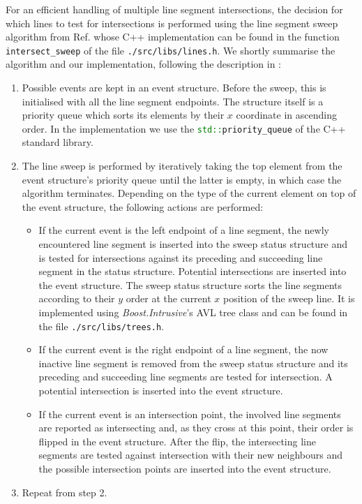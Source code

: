 For an efficient handling of multiple line segment intersections, the decision for which lines to test for intersections is
performed using the line segment sweep algorithm from Ref. \cite[pp. 69-80]{FUH_geo2020} whose C++ implementation can be
found in the function \lstinline[language=C++]|intersect_sweep| of the file \lstinline|./src/libs/lines.h|.
We shortly summarise the algorithm and our implementation, following the description in \cite[pp. 69-80]{FUH_geo2020}:
\begin{enumerate}
	\item Possible events are kept in an event structure. Before the sweep, this is initialised with all the line segment
		endpoints. The structure itself is a priority queue which sorts its elements by their $x$ coordinate in ascending order.
		In the implementation we use the \lstinline[language=C++]|std::priority_queue| of the C++ standard library.
	\item The line sweep is performed by iteratively taking the top element from the event structure's priority queue until
		the latter is empty, in which case the algorithm terminates.
		Depending on the type of the current element on top of the event structure, the following actions are performed:
		\begin{itemize}
			\item If the current event is the left endpoint of a line segment, the newly encountered line segment is
				inserted into the sweep status structure and is tested for intersections against its preceding and succeeding
				line segment in the status structure. Potential intersections are inserted into the event structure.
				The sweep status structure sorts the line segments according to their $y$ order at the current $x$ position
				of the sweep line. It is implemented using \textit{Boost.Intrusive}'s \cite{web_boost_intrusive}
				AVL tree class \cite{web_boost_intrusive_avltree} and can be found in the file \lstinline|./src/libs/trees.h|.
			\item If the current event is the right endpoint of a line segment, the now inactive line segment is
				removed from the sweep status structure and its preceding and succeeding line segments are tested
				for intersection. A potential intersection is inserted into the event structure.
			\item If the current event is an intersection point, the involved line segments are reported as intersecting
				and, as they cross at this point, their order is flipped in the event structure.
				After the flip, the intersecting line segments are tested against intersection with their new neighbours
				and the possible intersection points are inserted into the event structure.
		\end{itemize}
	\item Repeat from step 2.
\end{enumerate}


